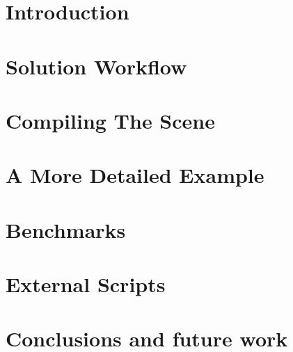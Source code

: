 \documentclass{sig-alternate}
\begin{document}


\section{Introduction}
\label{sec:intro}
 

\section{Solution Workflow}
\label{sec:solution_workflow}


\section{Compiling The Scene}
\label{sec:compiling_scene}


\section{A More Detailed Example}
\label{sec:case_study}


\section{Benchmarks}
\label{sec:benchmarks}
 

\section{External Scripts}
\label{sec:compiling_scripts}
 

\section{Conclusions and future work}
\label{sec:conclusions}
 


 

\nocite{}
\end{document}
